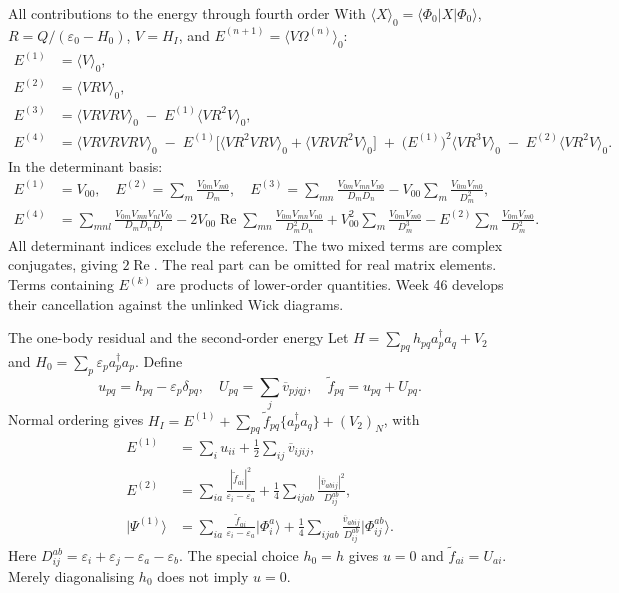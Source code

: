 \documentclass[aspectratio=169,10pt]{beamer}
\newcommand{\ket}[1]{\vert #1\rangle}
\newcommand{\mel}[3]{\langle #1\lvert #2\rvert #3\rangle}
\newcommand{\av}[1]{\langle #1\rangle_0}
\newcommand{\cre}[1]{a_{#1}^{\dagger}}
\newcommand{\ann}[1]{a_{#1}}
\newcommand{\no}[1]{\bigl\{#1\bigr\}}
\newcommand{\vbar}[4]{\overline v_{#1#2#3#4}}
\newcommand{\ph}{\Phi_0}
\newcommand{\ftil}[1]{\tilde f_{#1}}
\begin{document}
\begin{frame}[shrink=5]{All contributions to the energy through fourth order}
With \(\av{X}=\mel{\ph}{X}{\ph}\), \(R=Q/(\varepsilon_0-H_0)\), \(V=H_I\), and \(E^{(n+1)}=\av{V\Omega^{(n)}}\):
\begin{align*}
E^{(1)}&=\av{V},\\[2pt]
E^{(2)}&=\av{VRV},\\[2pt]
E^{(3)}&=\av{VRVRV}\;-\;E^{(1)}\av{VR^2V},\\[2pt]
E^{(4)}&=\av{VRVRVRV}\;-\;E^{(1)}\bigl[\av{VR^2VRV}+\av{VRVR^2V}\bigr]\;+\;\bigl(E^{(1)}\bigr)^2\av{VR^3V}\;-\;E^{(2)}\av{VR^2V}.
\end{align*}
In the determinant basis:
\begin{align*}
E^{(1)}&=V_{00},\quad E^{(2)}=\sum_m\frac{V_{0m}V_{m0}}{D_m},\quad
E^{(3)}=\sum_{mn}\frac{V_{0m}V_{mn}V_{n0}}{D_mD_n}-V_{00}\sum_m\frac{V_{0m}V_{m0}}{D_m^2},\\
E^{(4)}&=\sum_{mnl}\frac{V_{0m}V_{mn}V_{nl}V_{l0}}{D_mD_nD_l}
-2V_{00}\operatorname{Re}\sum_{mn}\frac{V_{0m}V_{mn}V_{n0}}{D_m^2D_n}
+V_{00}^2\sum_m\frac{V_{0m}V_{m0}}{D_m^3}
-E^{(2)}\sum_m\frac{V_{0m}V_{m0}}{D_m^2}.
\end{align*}
\small All determinant indices exclude the reference. The two mixed terms are complex conjugates, giving $2\operatorname{Re}$. The real part can be omitted for real matrix elements. Terms containing $E^{(k)}$ are products of lower-order quantities. Week 46 develops their cancellation against the unlinked Wick diagrams.
\end{frame}

\begin{frame}{The one-body residual and the second-order energy}
Let $H=\sum_{pq}h_{pq}\cre{p}\ann{q}+V_2$ and $H_0=\sum_p\varepsilon_p\cre{p}\ann{p}$. Define
\[
 u_{pq}=h_{pq}-\varepsilon_p\delta_{pq},\quad
 U_{pq}=\sum_j\vbar{p}{j}{q}{j},\quad \ftil{pq}=u_{pq}+U_{pq}.
\]
Normal ordering gives $H_I=E^{(1)}+\sum_{pq}\ftil{pq}\no{\cre{p}\ann{q}}+(V_2)_N$, with
\begin{align*}
 E^{(1)}&=\sum_i u_{ii}+\frac12\sum_{ij}\vbar{i}{j}{i}{j},\\
 E^{(2)}&=\sum_{ia}\frac{|\ftil{ai}|^2}{\varepsilon_i-\varepsilon_a}
       +\frac14\sum_{ijab}\frac{|\vbar{a}{b}{i}{j}|^2}{D_{ij}^{ab}},\\
 \ket{\Psi^{(1)}}&=\sum_{ia}\frac{\ftil{ai}}{\varepsilon_i-\varepsilon_a}\ket{\Phi_i^a}
       +\frac14\sum_{ijab}\frac{\vbar{a}{b}{i}{j}}{D_{ij}^{ab}}\ket{\Phi_{ij}^{ab}}.
\end{align*}
Here $D_{ij}^{ab}=\varepsilon_i+\varepsilon_j-\varepsilon_a-\varepsilon_b$. The special choice $h_0=h$ gives $u=0$ and $\ftil{ai}=U_{ai}$. Merely diagonalising $h_0$ does not imply $u=0$.
\end{frame}
\end{document}
